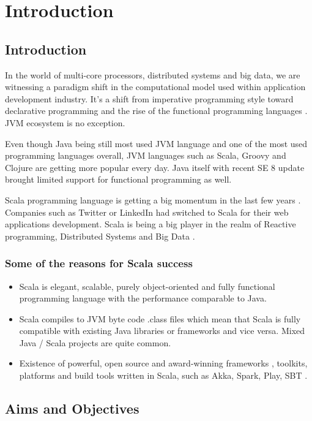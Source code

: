 \documentclass[12pt,twoside,a4paper]{report}
\begin{document}
\listoffigures
\tableofcontents{}


\chapter{Introduction}
\section{Introduction}
In the world of multi-core processors, distributed systems and big data, we are witnessing a paradigm shift in the computational model used within application development industry. It's a shift from imperative programming style toward declarative programming and the rise of the functional programming languages \cite{1}. JVM ecosystem is no exception.
  
Even though Java being still most used JVM language and one of the most used programming languages overall, JVM languages such as Scala, Groovy and Clojure are getting more popular every day. Java itself with recent SE 8 update brought limited support for functional programming as well.
  
Scala programming language \cite{2} is getting a big momentum in the last few years \cite{3}. Companies such as Twitter or LinkedIn \cite{4} had switched to Scala for their web applications development. Scala is being a big player in the realm of Reactive programming, Distributed Systems and Big Data \cite{5}.

\subsection{Some of the reasons for Scala success}
\begin{itemize}
\item Scala is elegant, scalable, purely object-oriented and fully functional programming language with the performance comparable to Java.
\item Scala compiles to JVM byte code .class files which mean that Scala is fully compatible with existing Java libraries or frameworks and vice versa. Mixed Java / Scala projects are quite common.
\item Existence of powerful, open source and award-winning frameworks \cite{6}, toolkits, platforms and build tools written in Scala, such as Akka, Spark, Play, SBT \cite{7}.
\end{itemize}

\section{Aims and Objectives}
\end{document}
